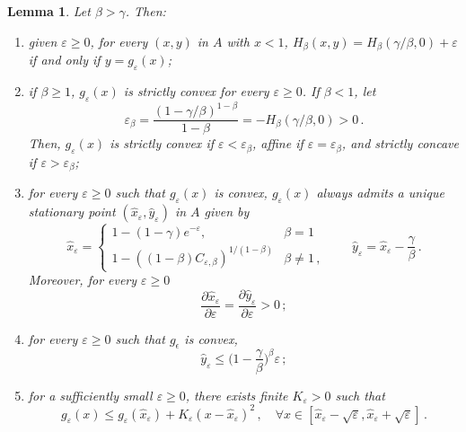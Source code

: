 \documentclass{article}
\newtheorem{lemma}{Lemma}[section]
\begin{document}
\begin{lemma}\label{lemma:g}
Let $\beta > \gamma$. Then: 
\begin{enumerate}
    \item[(i)] given $\varepsilon \ge 0$, for every $(x,y)$ in $A$ with $x < 1$, $H_\beta(x,y) = H_\beta(\gamma/\beta,0) + \varepsilon$ if and only if $y = g_\varepsilon(x)$;

    \item[(ii)] if $\beta \ge 1$, $g_\varepsilon(x)$ is strictly convex for every $\varepsilon \ge 0$. If $\beta < 1$, let
    $$
    \varepsilon_\beta = \frac{(1-\gamma/\beta)^{1-\beta}}{1-\beta} = -H_\beta(\gamma/\beta,0)>0\,.
    $$
Then, $g_\varepsilon(x)$ is strictly convex if $\varepsilon< \varepsilon_\beta$, affine if $\varepsilon = \varepsilon_\beta$, and strictly concave if $\varepsilon > \varepsilon_\beta$;

    \item[(iii)]
    for every $\varepsilon \ge 0$ such that $g_\varepsilon(x)$ is convex, $g_\varepsilon(x)$ always admits a unique stationary point $(\hat x_\varepsilon,\hat y_\varepsilon)$ in $A$ given by
    \begin{equation}\label{eq:xy}    
        \hat{x}_{\varepsilon} =\begin{cases}
        1 - (1 - \gamma)e^{- \varepsilon}, & \beta = 1\\
        1-((1-\beta)C_{\varepsilon,\beta})^{1/(1-\beta)}
        & \beta \neq 1\,,
        \end{cases}\qquad \hat{y}_{\varepsilon} = \hat x_\varepsilon - \frac{\gamma}{\beta}\,.
\end{equation}
Moreover, for every $\varepsilon \ge 0$
\begin{equation}\label{eq:mono}
\frac{\partial \hat x_\varepsilon}{\partial \varepsilon} = \frac{\partial \hat y_\varepsilon}{\partial \varepsilon} > 0\,;
\end{equation}
        \item[(iv)] for every $\varepsilon \ge 0$ such that $g_{\epsilon}$ is convex,
        \begin{equation*}
            \hat y_\varepsilon \leq \Big(1 - \displaystyle\frac{\gamma}{\beta}\Big)^{\beta}\varepsilon\,;
        \end{equation*}
        \item[(v)] for a sufficiently small $\varepsilon \ge 0$, there exists finite $K_\varepsilon>0$ such that
        $$
        g_{\varepsilon}(x) \leq g_{\varepsilon}(\hat{x}_{\varepsilon}) + K_\varepsilon (x-\hat{x}_{\varepsilon})^2\,, \quad \forall x \in [\hat{x}_{\varepsilon} - \sqrt{\varepsilon}, \hat{x}_{\varepsilon} + \sqrt{\varepsilon}]\,.
        $$
    \end{enumerate}
\end{lemma}
\end{document}
